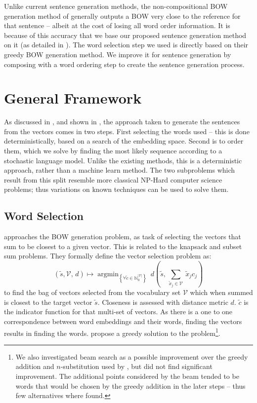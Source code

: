 \documentclass[compsoc]{IEEEtran}
\theoremstyle{plain}
\theoremstyle{definition}
\DeclareMathOperator*{\argmin}{argmin}
\begin{document}
Unlike current sentence generation methods, the non-compositional BOW generation method of \textcite{White2015BOWgen} generally outputs a BOW very close to the reference for that sentence -- albeit at the cost of losing all word order information. It is because of this accuracy that we base our proposed sentence generation method on it (as detailed in ). The word selection step we used is directly based on their greedy BOW generation method. We improve it for sentence generation by composing with a word ordering step to create the sentence generation process.



\section{General Framework}\label{framework}
As discussed in , and shown in , the approach taken to generate the sentences from the vectors comes in two steps. First selecting the words used -- this is done deterministically, based on a search of the embedding space. Second is to order them, which we solve by finding the most likely sequence according to a stochastic language model. Unlike the existing methods, this is a deterministic approach, rather than a machine learn method. The two subproblems which result from this split resemble more classical NP-Hard computer science problems; thus variations on known techniques can be used to solve them.

\subsection{Word Selection} \label{selection}
\renewcommand{\c}{\tilde{c}}
\newcommand{\s}{\tilde{s}}
\newcommand{\x}{\tilde{x}}
\renewcommand{\t}{\tilde{t}}
\newcommand{\N}{\mathbb{N}}
\newcommand{\R}{\mathbb{R}}
\newcommand{\V}{\mathcal{V}}
\def\B{\mathcal{B}}




\textcite{White2015BOWgen} approaches the BOW generation problem, as task of selecting the vectors that sum to be closest to a given vector. This is related to the knapsack and subset sum problems. They formally define the vector selection problem as:
\[
(\s,\V,\,d) \mapsto \argmin_{\left\{ \forall\c\in\N_{0}^{|\V|}\right\} }\:d( \s,\,\sum_{\x_j\in\V}\:\x_{j}c_{j})
\]
to find the bag of vectors selected from the vocabulary set $\V$ which when summed is closest to the target vector $\s$. Closeness is assessed with distance metric $d$. $\c$ is the indicator function for that multi-set of vectors. As there is a one to one correspondence between word embeddings and their words, finding the vectors results in finding the words. \textcite{White2015BOWgen} propose a greedy solution to the problem\footnote{We also investigated beam search as a possible improvement over the  greedy addition and $n$-substitution  used by \textcite{White2015BOWgen}, but did not find significant improvement. The additional points considered by the beam tended to be words that would be chosen by the greedy addition in the later steps -- thus few alternatives where found.}.
\end{document}
